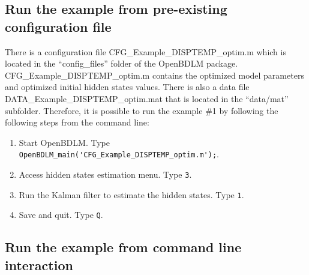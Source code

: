 \subsection{Run the example from pre-existing configuration file}
There is a configuration file CFG\_Example\_DISPTEMP\_optim.m which is located in the ``config\_files'' folder of the OpenBDLM package.
CFG\_Example\_DISPTEMP\_optim.m contains the optimized model parameters and optimized initial hidden states values.
There is also a data file DATA\_Example\_DISPTEMP\_optim.mat that is located in the ``data/mat'' subfolder.
Therefore, it is possible to run the example \#1 by following the following steps from the \MATLAB{} command line:
\begin{enumerate}
\item Start OpenBDLM. Type \colorbox{light-gray}{\lstinline[basicstyle = \mlttfamily \small, backgroundcolor = \color{light-gray}]!OpenBDLM_main('CFG_Example_DISPTEMP_optim.m');!}.
\item Access hidden states estimation menu. Type \colorbox{light-gray}{\lstinline[basicstyle = \mlttfamily \small, backgroundcolor = \color{light-gray}]!3!}.
\item Run the Kalman filter to estimate the hidden states. Type \colorbox{light-gray}{\lstinline[basicstyle = \mlttfamily \small, backgroundcolor = \color{light-gray}]!1!}.
\item Save and quit. Type \colorbox{light-gray}{\lstinline[basicstyle = \mlttfamily \small, backgroundcolor = \color{light-gray}]!Q!}.
\end{enumerate}


\subsection{Run the example from command line interaction}

